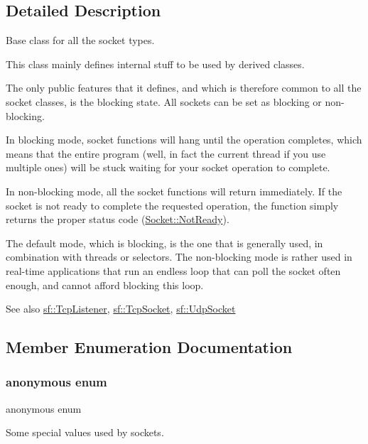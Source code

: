 \subsection{Detailed Description}
Base class for all the socket types. 

This class mainly defines internal stuff to be used by derived classes.

The only public features that it defines, and which is therefore common to all the socket classes, is the blocking state. All sockets can be set as blocking or non-\/blocking.

In blocking mode, socket functions will hang until the operation completes, which means that the entire program (well, in fact the current thread if you use multiple ones) will be stuck waiting for your socket operation to complete.

In non-\/blocking mode, all the socket functions will return immediately. If the socket is not ready to complete the requested operation, the function simply returns the proper status code (\hyperlink{classsf_1_1_socket_a51bf0fd51057b98a10fbb866246176dca8554848daae98f996e131bdeed076c09}{Socket\+::\+Not\+Ready}).

The default mode, which is blocking, is the one that is generally used, in combination with threads or selectors. The non-\/blocking mode is rather used in real-\/time applications that run an endless loop that can poll the socket often enough, and cannot afford blocking this loop.

\begin{DoxySeeAlso}{See also}
\hyperlink{classsf_1_1_tcp_listener}{sf\+::\+Tcp\+Listener}, \hyperlink{classsf_1_1_tcp_socket}{sf\+::\+Tcp\+Socket}, \hyperlink{classsf_1_1_udp_socket}{sf\+::\+Udp\+Socket} 
\end{DoxySeeAlso}


\subsection{Member Enumeration Documentation}
\mbox{\label{classsf_1_1_socket_a478fc5d82347df37c24f10c32de8cca7}} 
\subsubsection{\texorpdfstring{anonymous enum}{anonymous enum}}
{\footnotesize\ttfamily anonymous enum}



Some special values used by sockets. 


